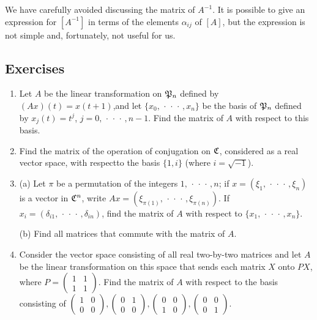 We have carefully avoided discussing the matrix of \(A^{-1}\). It is possible to
give an expression for \([A^{-1}]\) in terms of the elements \(\alpha_{ij}\) of
\([A]\), but the expression is not simple and, fortunately, not useful for us.

{\small
\subsection*{Exercises}

\begin{enumerate}[wide]
    \item Let \(A\) be the linear transformation on \(\mathfrak{P}_n\) defined by
    \((Ax)(t) = x(t + 1)\),and let \(\{x_0, \,\cdot\,\cdot\,\cdot\,, x_n\}\) be the basis of
    \(\mathfrak{P}_n\) defined by \(x_j(t) = t^j\), \(j = 0, \,\cdot\,\cdot\,\cdot\,, n-1\). Find the
    matrix of \(A\) with respect to this basis.
    
    \item Find the matrix of the operation of conjugation on \(\mathfrak{C}\),
    considered as a real vector space, with respectto the basis \(\{1, i\}\)
    (where \(i = \sqrt{-1}\)).
    
    \item (a) Let \(\pi\) be a permutation of the integers \(1, \,\cdot\,\cdot\,\cdot\,, n\); if
    \(x = (\xi_1, \,\cdot\,\cdot\,\cdot\,, \xi_n)\) is a vector in \(\mathfrak{C}^n\), write \(Ax =
    (\xi_{\pi(1)}, \,\cdot\,\cdot\,\cdot\,, \xi_{\pi(n)})\). If \(x_i = (\delta_{i1}, \,\cdot\,\cdot\,\cdot\,,
    \delta_{in})\), find the matrix of \(A\) with respect to \(\{x_1, \,\cdot\,\cdot\,\cdot\,,
    x_n\}\).
    
    (b) Find all matrices that commute with the matrix of \(A\).

    \item Consider the vector space consisting of all real two-by-two matrices and let \(A\) be the linear transformation on this space that sends each matrix \(X\) onto \(PX\), where \(P = \begin{pmatrix}
        1 & 1 \\
        1 & 1
    \end{pmatrix}\). Find the matrix of \(A\) with respect to the basis consisting of \(\begin{pmatrix}
        1 & 0 \\
        0 & 0
    \end{pmatrix}, \begin{pmatrix}
        0 & 1 \\
        0 & 0
    \end{pmatrix}, \begin{pmatrix}
        0 & 0 \\
        1 & 0
    \end{pmatrix}, \begin{pmatrix}
        0 & 0 \\
        0 & 1
    \end{pmatrix}\).


\end{enumerate}}
